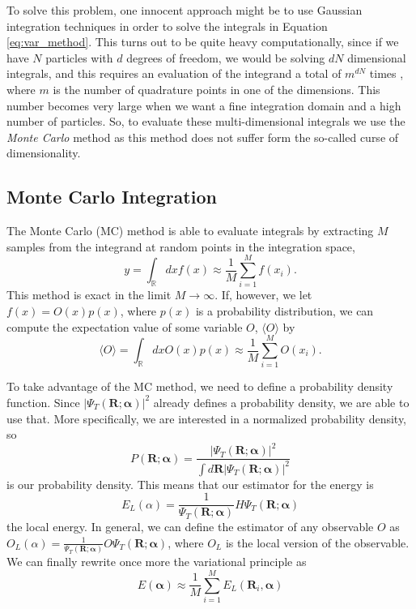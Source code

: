 \documentclass[aps,reprint,superscriptaddress,nofootinbib]{revtex4-2}
\begin{document}
    To solve this problem, one innocent approach might be to use Gaussian integration techniques in order to solve the integrals in Equation \eqref{eq:var_method}. This turns out to be quite heavy computationally, since if we have \(N\) particles with \(d\) degrees of freedom, we would be solving \(dN\) dimensional integrals, and this requires an evaluation of the integrand a total of \(m^{dN}\) times \cite{curse_dim}, where \(m\) is the number of quadrature points in one of the dimensions. This number becomes very large when we want a fine integration domain and a high number of particles. So, to evaluate these multi-dimensional integrals we use the \textit{Monte Carlo} method \cite{landau_binder_2014} as this method does not suffer form the so-called curse of dimensionality.
    
\subsection*{Monte Carlo Integration}

    The Monte Carlo (MC) method is able to evaluate integrals by extracting \(M\) samples from the integrand at random points in the integration space,
    \begin{equation*}
        y = \int_{\mathbb{R}} dx f(x) \approx \frac{1}{M} \sum_{i=1}^{M} f(x_i).
    \end{equation*}
    This method is exact in the limit \(M \rightarrow \infty\). If, however, we let \(f(x) = O(x) p(x)\), where \(p(x)\) is a probability distribution, we can compute the expectation value of some variable \(O\), \(\langle O \rangle\) by
    \begin{equation*}
        \langle O \rangle = \int_{\mathbb{R}} dx O(x)p(x) \approx \frac{1}{M} \sum_{i=1}^{M} O(x_i).
    \end{equation*}
    
    To take advantage of the MC method, we need to define a probability density function. Since \(\left| \Psi_T(\bm R; \bm \alpha) \right|^2\) already defines a probability density, we are able to use that. More specifically, we are interested in a normalized probability density, so
    \begin{equation} \label{eq:pdf_vmc}
        P(\bm R; \bm \alpha) = \frac{\left| \Psi_T(\bm R; \bm \alpha) \right|^2}{\int d\bm R \left| \Psi_T(\bm R; \bm \alpha) \right|^2}
    \end{equation}
    is our probability density. This means that our estimator for the energy is  
    \begin{equation*}
        E_L(\alpha) = \frac{1}{\Psi_T(\bm R; \bm \alpha)} H \Psi_T(\bm R; \bm \alpha)
    \end{equation*}
    the local energy. In general, we can define the estimator of any observable \(O\) as \(O_L(\alpha) = \frac{1}{\Psi_T(\bm R; \bm \alpha)} O \Psi_T(\bm R; \bm \alpha)\), where \(O_L\) is the local version of the observable. We can finally rewrite once more the variational principle as 
    \begin{equation*}
        E(\bm \alpha) \approx \frac{1}{M} \sum_{i=1}^{M} E_L(\bm R_i, \bm \alpha)
    \end{equation*}
    
\end{document}
